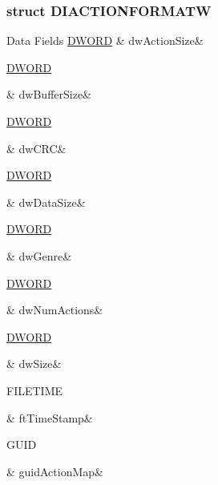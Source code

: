 \subsubsection{struct D\-I\-A\-C\-T\-I\-O\-N\-F\-O\-R\-M\-A\-T\-W}
\begin{DoxyFields}{Data Fields}
\hypertarget{a00003_ae15443760fb1e56392d47da22bd9d103}{\hyperlink{a00003_a50e15ae51c87ae06ab29c8148cb5f36c}{D\-W\-O\-R\-D}}\label{a00003_ae15443760fb1e56392d47da22bd9d103}
&
dw\-Action\-Size&
\\
\hline

\hypertarget{a00003_a92761eecb6910f4a437a95dd14171e93}{\hyperlink{a00003_a50e15ae51c87ae06ab29c8148cb5f36c}{D\-W\-O\-R\-D}}\label{a00003_a92761eecb6910f4a437a95dd14171e93}
&
dw\-Buffer\-Size&
\\
\hline

\hypertarget{a00003_ae4dd9dc42f5e54b0d46f4fdd0a8bde8c}{\hyperlink{a00003_a50e15ae51c87ae06ab29c8148cb5f36c}{D\-W\-O\-R\-D}}\label{a00003_ae4dd9dc42f5e54b0d46f4fdd0a8bde8c}
&
dw\-C\-R\-C&
\\
\hline

\hypertarget{a00003_a6599e7e2ac8527227e1b25a7cf171709}{\hyperlink{a00003_a50e15ae51c87ae06ab29c8148cb5f36c}{D\-W\-O\-R\-D}}\label{a00003_a6599e7e2ac8527227e1b25a7cf171709}
&
dw\-Data\-Size&
\\
\hline

\hypertarget{a00003_a7f25e1451e47f306ba2f7b4df8a98cb7}{\hyperlink{a00003_a50e15ae51c87ae06ab29c8148cb5f36c}{D\-W\-O\-R\-D}}\label{a00003_a7f25e1451e47f306ba2f7b4df8a98cb7}
&
dw\-Genre&
\\
\hline

\hypertarget{a00003_ab3c72dc33adb40eb012766701fb54b26}{\hyperlink{a00003_a50e15ae51c87ae06ab29c8148cb5f36c}{D\-W\-O\-R\-D}}\label{a00003_ab3c72dc33adb40eb012766701fb54b26}
&
dw\-Num\-Actions&
\\
\hline

\hypertarget{a00003_a669c5a85f5a9eb97e64ad880fadaaa2d}{\hyperlink{a00003_a50e15ae51c87ae06ab29c8148cb5f36c}{D\-W\-O\-R\-D}}\label{a00003_a669c5a85f5a9eb97e64ad880fadaaa2d}
&
dw\-Size&
\\
\hline

\hypertarget{a00003_a29b28c447c8479ccca5479fe86ffddc8}{F\-I\-L\-E\-T\-I\-M\-E}\label{a00003_a29b28c447c8479ccca5479fe86ffddc8}
&
ft\-Time\-Stamp&
\\
\hline

\hypertarget{a00003_ac580279a42dedf4f7b6ad1abed891f6e}{G\-U\-I\-D}\label{a00003_ac580279a42dedf4f7b6ad1abed891f6e}
&
guid\-Action\-Map&
\\
\hline


\end{DoxyFields}
